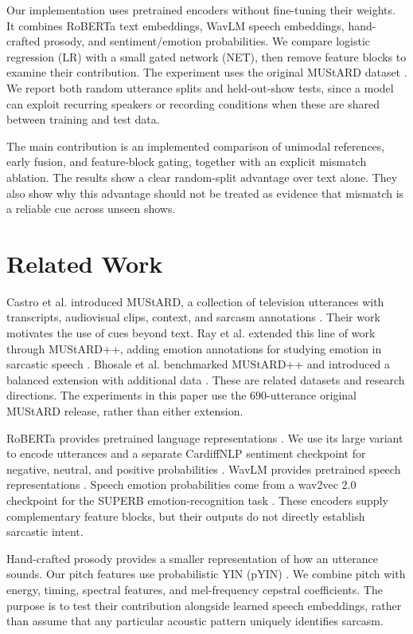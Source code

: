 \documentclass[conference]{IEEEtran}
\begin{document}
Our implementation uses pretrained encoders without fine-tuning their weights. It combines RoBERTa text embeddings, WavLM speech embeddings, hand-crafted prosody, and sentiment/emotion probabilities. We compare logistic regression (LR) with a small gated network (NET), then remove feature blocks to examine their contribution. The experiment uses the original MUStARD dataset \cite{castro2019}. We report both random utterance splits and held-out-show tests, since a model can exploit recurring speakers or recording conditions when these are shared between training and test data.

The main contribution is an implemented comparison of unimodal references, early fusion, and feature-block gating, together with an explicit mismatch ablation. The results show a clear random-split advantage over text alone. They also show why this advantage should not be treated as evidence that mismatch is a reliable cue across unseen shows.

\section{Related Work}
Castro et al. introduced MUStARD, a collection of television utterances with transcripts, audiovisual clips, context, and sarcasm annotations \cite{castro2019}. Their work motivates the use of cues beyond text. Ray et al. extended this line of work through MUStARD++, adding emotion annotations for studying emotion in sarcastic speech \cite{ray2022}. Bhosale et al. benchmarked MUStARD++ and introduced a balanced extension with additional data \cite{bhosale2023}. These are related datasets and research directions. The experiments in this paper use the 690-utterance original MUStARD release, rather than either extension.

RoBERTa provides pretrained language representations \cite{liu2019}. We use its large variant to encode utterances and a separate CardiffNLP sentiment checkpoint for negative, neutral, and positive probabilities \cite{cardiff}. WavLM provides pretrained speech representations \cite{chen2022}. Speech emotion probabilities come from a wav2vec 2.0 checkpoint for the SUPERB emotion-recognition task \cite{yang2021,superber}. These encoders supply complementary feature blocks, but their outputs do not directly establish sarcastic intent.

Hand-crafted prosody provides a smaller representation of how an utterance sounds. Our pitch features use probabilistic YIN (pYIN) \cite{mauch2014}. We combine pitch with energy, timing, spectral features, and mel-frequency cepstral coefficients. The purpose is to test their contribution alongside learned speech embeddings, rather than assume that any particular acoustic pattern uniquely identifies sarcasm.
\end{document}
